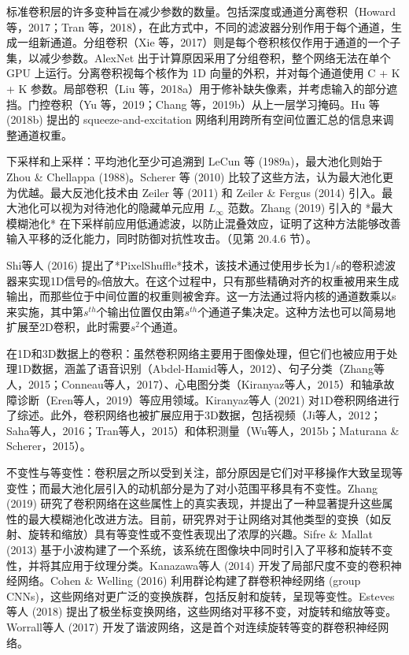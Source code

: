 标准卷积层的许多变种旨在减少参数的数量。包括深度或通道分离卷积（Howard 等，2017；Tran 等，2018），在此方式中，不同的滤波器分别作用于每个通道，生成一组新通道。分组卷积（Xie 等，2017）则是每个卷积核仅作用于通道的一个子集，以减少参数。AlexNet 出于计算原因采用了分组卷积，整个网络无法在单个 GPU 上运行。分离卷积视每个核作为 1D 向量的外积，并对每个通道使用 C + K + K 参数。局部卷积（Liu 等，2018a）用于修补缺失像素，并考虑输入的部分遮挡。门控卷积（Yu 等，2019；Chang 等，2019b）从上一层学习掩码。Hu 等 (2018b) 提出的 squeeze-and-excitation 网络利用跨所有空间位置汇总的信息来调整通道权重。

下采样和上采样：平均池化至少可追溯到 LeCun 等 (1989a)，最大池化则始于 Zhou & Chellappa (1988)。Scherer 等 (2010) 比较了这些方法，认为最大池化更为优越。最大反池化技术由 Zeiler 等 (2011) 和 Zeiler & Fergus (2014) 引入。最大池化可以视为对待池化的隐藏单元应用 \(L_{\infty}\) 范数。Zhang (2019) 引入的 *最大模糊池化* 在下采样前应用低通滤波，以防止混叠效应，证明了这种方法能够改善输入平移的泛化能力，同时防御对抗性攻击。（见第 20.4.6 节）。

Shi等人 (2016) 提出了*PixelShuffle*技术，该技术通过使用步长为1/s的卷积滤波器来实现1D信号的s倍放大。在这个过程中，只有那些精确对齐的权重被用来生成输出，而那些位于中间位置的权重则被舍弃。这一方法通过将内核的通道数乘以s来实施，其中第\(s^{th}\)个输出位置仅由第\(s^{th}\)个通道子集决定。这种方法也可以简易地扩展至2D卷积，此时需要\(s^2\)个通道。

在1D和3D数据上的卷积：虽然卷积网络主要用于图像处理，但它们也被应用于处理1D数据，涵盖了语音识别（Abdel-Hamid等人，2012）、句子分类（Zhang等人，2015；Conneau等人，2017）、心电图分类（Kiranyaz等人，2015）和轴承故障诊断（Eren等人，2019）等应用领域。Kiranyaz等人 (2021) 对1D卷积网络进行了综述。此外，卷积网络也被扩展应用于3D数据，包括视频（Ji等人，2012；Saha等人，2016；Tran等人，2015）和体积测量（Wu等人，2015b；Maturana & Scherer，2015）。

不变性与等变性：卷积层之所以受到关注，部分原因是它们对平移操作大致呈现等变性；而最大池化层引入的动机部分是为了对小范围平移具有不变性。Zhang (2019) 研究了卷积网络在这些属性上的真实表现，并提出了一种显著提升这些属性的最大模糊池化改进方法。目前，研究界对于让网络对其他类型的变换（如反射、旋转和缩放）具有等变性或不变性表现出了浓厚的兴趣。Sifre & Mallat (2013) 基于小波构建了一个系统，该系统在图像块中同时引入了平移和旋转不变性，并将其应用于纹理分类。Kanazawa等人 (2014) 开发了局部尺度不变的卷积神经网络。Cohen & Welling (2016) 利用群论构建了群卷积神经网络 (group CNNs)，这些网络对更广泛的变换族群，包括反射和旋转，呈现等变性。Esteves等人 (2018) 提出了极坐标变换网络，这些网络对平移不变，对旋转和缩放等变。Worrall等人 (2017) 开发了谐波网络，这是首个对连续旋转等变的群卷积神经网络。

